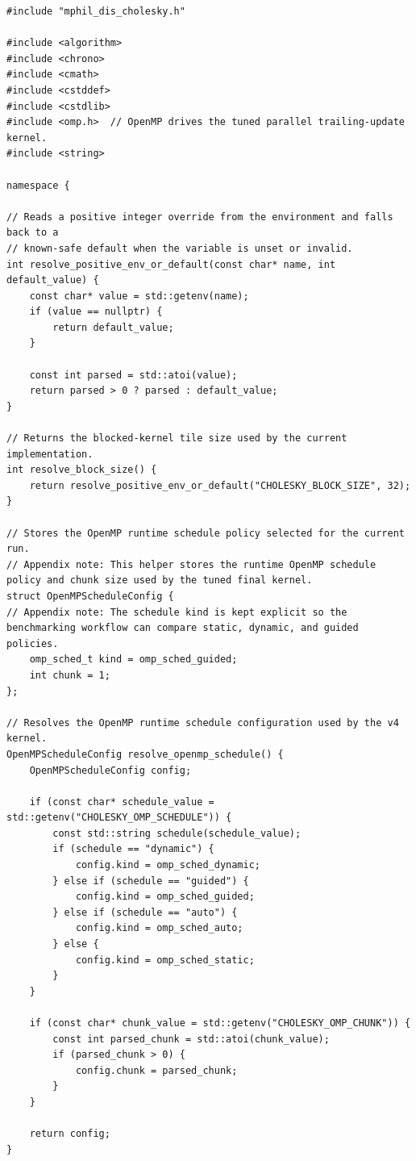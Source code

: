 \begin{lstlisting}[style=appendixcode]
#include "mphil_dis_cholesky.h"

#include <algorithm>
#include <chrono>
#include <cmath>
#include <cstddef>
#include <cstdlib>
#include <omp.h>  // OpenMP drives the tuned parallel trailing-update kernel.
#include <string>

namespace {

// Reads a positive integer override from the environment and falls back to a
// known-safe default when the variable is unset or invalid.
int resolve_positive_env_or_default(const char* name, int default_value) {
    const char* value = std::getenv(name);
    if (value == nullptr) {
        return default_value;
    }

    const int parsed = std::atoi(value);
    return parsed > 0 ? parsed : default_value;
}

// Returns the blocked-kernel tile size used by the current implementation.
int resolve_block_size() {
    return resolve_positive_env_or_default("CHOLESKY_BLOCK_SIZE", 32);
}

// Stores the OpenMP runtime schedule policy selected for the current run.
// Appendix note: This helper stores the runtime OpenMP schedule policy and chunk size used by the tuned final kernel.
struct OpenMPScheduleConfig {
// Appendix note: The schedule kind is kept explicit so the benchmarking workflow can compare static, dynamic, and guided policies.
    omp_sched_t kind = omp_sched_guided;
    int chunk = 1;
};

// Resolves the OpenMP runtime schedule configuration used by the v4 kernel.
OpenMPScheduleConfig resolve_openmp_schedule() {
    OpenMPScheduleConfig config;

    if (const char* schedule_value = std::getenv("CHOLESKY_OMP_SCHEDULE")) {
        const std::string schedule(schedule_value);
        if (schedule == "dynamic") {
            config.kind = omp_sched_dynamic;
        } else if (schedule == "guided") {
            config.kind = omp_sched_guided;
        } else if (schedule == "auto") {
            config.kind = omp_sched_auto;
        } else {
            config.kind = omp_sched_static;
        }
    }

    if (const char* chunk_value = std::getenv("CHOLESKY_OMP_CHUNK")) {
        const int parsed_chunk = std::atoi(chunk_value);
        if (parsed_chunk > 0) {
            config.chunk = parsed_chunk;
        }
    }

    return config;
}


\end{lstlisting}
